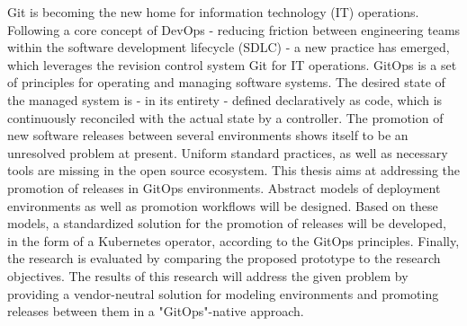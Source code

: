 
\noindent
Git is becoming the new home for information technology (IT) operations.
Following a core concept of DevOps
- reducing friction between engineering teams within the software development lifecycle (SDLC) -
a new practice has emerged,
which leverages the revision control system Git for IT operations.
GitOps is a set of principles for operating and managing software systems.
The desired state of the managed system is
- in its entirety -
defined declaratively as code,
which is continuously reconciled with the actual state by a controller.
The promotion of new software releases between several environments
shows itself to be an unresolved problem at present.
Uniform standard practices, as well as necessary tools are missing in the open source ecosystem.
This thesis aims at addressing
the promotion of releases in GitOps environments.
Abstract models of deployment environments as well as promotion workflows
will be designed.
Based on these models,
a standardized solution for the promotion of releases
will be developed,
in the form of a Kubernetes operator,
according to the GitOps principles.
Finally, the research is evaluated by comparing the proposed prototype
to the research objectives.
The results of this research will
address the given problem
by providing a vendor-neutral solution
for modeling environments and promoting releases between them
in a "GitOps"-native approach.






